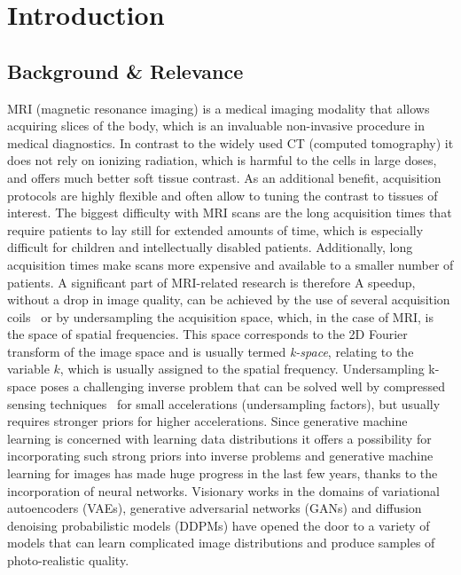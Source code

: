 %


\chapter{Introduction}
\section{Background \& Relevance}
MRI (magnetic resonance imaging) is a medical imaging modality that allows acquiring slices of the body, which is an invaluable non-invasive procedure in medical diagnostics. In contrast to the widely used CT (computed tomography) it does not rely on ionizing radiation, which is harmful to the cells in large doses, and offers much better soft tissue contrast. As an additional benefit, acquisition protocols are highly flexible and often allow to tuning the contrast to tissues of interest. The biggest difficulty with MRI scans are the long acquisition times that require patients to lay still for extended amounts of time, which is especially difficult for children and intellectually disabled patients. Additionally, long acquisition times make scans more expensive and available to a smaller number of patients. A significant part of MRI-related research is therefore A speedup, without a drop in image quality, can be achieved by the use of several acquisition coils~\autocite{sodickson1997smash,pruessmann1999sense,griswold2002grappa} or by undersampling the acquisition space, which, in the case of MRI, is the space of spatial frequencies. This space corresponds to the 2D Fourier transform of the image space and is usually termed \textit{k-space}, relating to the variable $k$, which is usually assigned to the spatial frequency. Undersampling k-space poses a challenging inverse problem that can be solved well by compressed sensing techniques~\autocite{donoho2006compressedsensing,candes2005stable} for small accelerations (undersampling factors), but usually requires stronger priors for higher accelerations. Since generative machine learning is concerned with learning data distributions it offers a possibility for incorporating such strong priors into inverse problems and generative machine learning for images has made huge progress in the last few years, thanks to the incorporation of neural networks. Visionary works in the domains of variational autoencoders (VAEs), generative adversarial networks (GANs) and diffusion denoising probabilistic models (DDPMs) have opened the door to a variety of models that can learn complicated image distributions and produce samples of photo-realistic quality.~\autocite{kingma2013autoencoding,goodfellow2014generative,sohldickstein2015deep,ho2020denoising}

